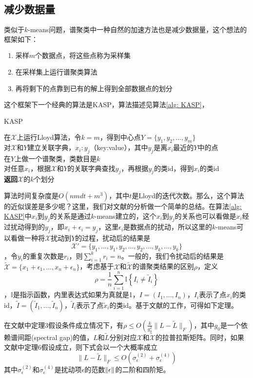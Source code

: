 \subsection{减少数据量}
类似于$k$-means问题，谱聚类中一种自然的加速方法也是减少数据量，这个想法的框架如下：
\begin{enumerate}
    \item 采样$m$个数据点，将这些点称为采样集
    \item 在采样集上运行谱聚类算法
    \item 再将剩下的点靠到已有的解上得到全部数据点的划分
\end{enumerate}
这个框架下一个经典的算法是KASP，算法描述见算法\ref{alg: KASP}，
\begin{algorithm}
    \caption{KASP}\label{alg: KASP}
    在$\mathcal{X}$上运行Lloyd算法，令$k=m$，得到中心点$Y = \{y_1,y_2,...,y_m\}$\\
    对$\mathcal{X}$和$Y$建立关联字典，$x_i:y_j$（key:value），其中$y_j$是离$x_i$最近的$Y$中的点　\\
    在$Y$上做一个谱聚类，类数目是$k$ \\
    对任意$x_i$，根据$\mathcal{X}$和$Y$的关联字典查找$y_j$，再根据$y_j$的类id，得到$x_i$的类id\\
    \textbf{返回}$\mathcal{X}$的$k$个划分
\end{algorithm}
算法时间复杂度是$O(nmdt+m^3)$，其中$t$是Lloyd的迭代次数。那么，这个算法的近似误差是多少呢？这里，我们对文献\cite{yan2009fast}的分析做一个简单的总结。在算法\ref{alg: KASP}中$x_i$到$y_j$的关系是通过$k$-means建立的，这个$x_i$到$y_j$的关系也可以看做是$x_i$经过扰动得到的$y_j$，即$x_i+\epsilon_i = y_j$，这里$\epsilon_i$是数据点的扰动，所以这里的$k$-means可以看做一种将$\mathcal{X}$扰动到$Y$的过程，扰动后的结果是$$\mathcal{X}' = \{y_1,...,y_1,y_2,...,y_2,...,y_k,...,y_k\}$$，令$y_i$的重复次数是$r_i$，则$\sum_{i=1}^k r_i = n$。一般的，我们令扰动后的结果是$\tilde{\mathcal{X}} = \{x_1+\epsilon_1,...,x_n+\epsilon_n\}$，考虑基于$\mathcal{X}$和$\tilde{\mathcal{X}}$的谱聚类结果的区别$\rho$，定义$$\rho=\frac{1}{n} \sum_{i=1}^{n} \mathbb{I}\left\{I_{i} \neq \tilde{I}_{i}\right\}$$，$\mathbb{I}$是指示函数，内里表达式如果为真就是1，$I = (I_1,...,I_n)$，$I_i$表示了点$x_i$的类id，$\tilde{I} = (\tilde{I}_1,...,\tilde{I}_n)$，$\tilde{I}_i$表示了点$\tilde{x}_i$的类id。基于文献\cite{huang2009spectral}的工作，可得如下定理。
\begin{theorem}[KASP的理论保证]
    在文献\cite{yan2009fast}中定理3假设条件成立情况下，有$\rho \leq O\left(\frac{k}{g_{0}^{2}}\|L-\tilde{L}\|_{F}\right)$，其中$g_0$是一个依赖谱间距(spectral gap)的值，$L$和$\tilde{L}$分别对应$\mathcal{X}$和$\tilde{\mathcal{X}}$的拉普拉斯矩阵。同时，如果文献\cite{yan2009fast}中定理6假设成立，则下式会以一个大概率成立
    \begin{equation*}
        \|L-\tilde{L}\|_{F} \leq O\left(\sigma_{\epsilon}^{(2)}+\sigma_{\epsilon}^{(4)}\right)
    \end{equation*}
    其中$\sigma_{\epsilon}^{(2)}$和$\sigma_{\epsilon}^{(4)}$是扰动项$\epsilon$的范数$\left\lVert\epsilon\right\rVert$的二阶和四阶矩。
\end{theorem}
